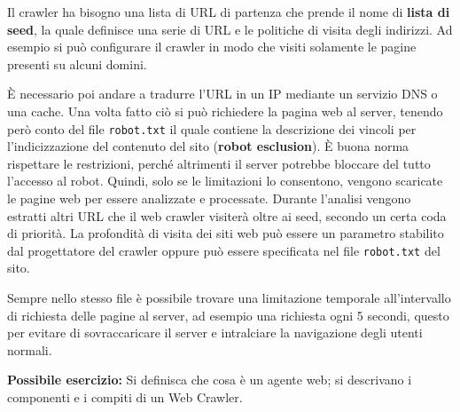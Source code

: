 Il crawler ha bisogno una lista di URL di partenza che prende il nome di \textbf{lista di seed}, la quale definisce una serie di URL e le politiche di visita degli indirizzi.
Ad esempio si può configurare il crawler in modo che visiti solamente le pagine presenti su alcuni domini.

\`E necessario poi andare a tradurre l'URL in un IP mediante un servizio DNS o una cache. Una volta fatto ciò si può richiedere la pagina web al server, tenendo però conto del file \texttt{robot.txt} il quale contiene la descrizione dei vincoli per l'indicizzazione del contenuto del sito (\textbf{robot esclusion}).
\`E buona norma rispettare le restrizioni, perché altrimenti il server potrebbe bloccare del tutto l'accesso al robot.
Quindi, solo se le limitazioni lo consentono, vengono scaricate le pagine web per essere analizzate e processate. Durante l'analisi vengono estratti altri URL che il web crawler visiterà oltre ai seed, secondo un certa coda di priorità.
La profondità di visita dei siti web può essere un parametro stabilito dal progettatore del crawler oppure può essere specificata nel file \texttt{robot.txt} del sito.

Sempre nello stesso file è possibile trovare una limitazione temporale all'intervallo di richiesta delle pagine al server, ad esempio una richiesta ogni 5 secondi, questo per evitare di sovraccaricare il server e intralciare la navigazione degli utenti normali.

\textbf{{\color{Red} Possibile esercizio:}} Si definisca che cosa è un agente web; si descrivano i componenti e i compiti di un Web Crawler.


















